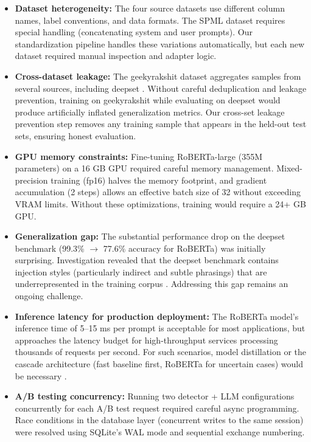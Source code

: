\documentclass[12pt, letterpaper]{article}   %
\begin{document}
\begin{itemize}
    \item \textbf{Dataset heterogeneity:} The four source datasets use different column names, label conventions, and data formats. The SPML dataset requires special handling (concatenating system and user prompts). Our standardization pipeline handles these variations automatically, but each new dataset required manual inspection and adapter logic.

    \item \textbf{Cross-dataset leakage:} The geekyrakshit dataset aggregates samples from several sources, including deepset \cite{ref33}\cite{ref1}. Without careful deduplication and leakage prevention, training on geekyrakshit while evaluating on deepset would produce artificially inflated generalization metrics. Our cross-set leakage prevention step removes any training sample that appears in the held-out test sets, ensuring honest evaluation.

    \item \textbf{GPU memory constraints:} Fine-tuning RoBERTa-large (355M parameters) on a 16 GB GPU required careful memory management. Mixed-precision training (fp16) halves the memory footprint, and gradient accumulation (2 steps) allows an effective batch size of 32 without exceeding VRAM limits. Without these optimizations, training would require a 24+ GB GPU.

    \item \textbf{Generalization gap:} The substantial performance drop on the deepset benchmark (99.3\% $\rightarrow$ 77.6\% accuracy for RoBERTa) was initially surprising. Investigation revealed that the deepset benchmark contains injection styles (particularly indirect and subtle phrasings) that are underrepresented in the training corpus \cite{ref10}. Addressing this gap remains an ongoing challenge.

    \item \textbf{Inference latency for production deployment:} The RoBERTa model's inference time of 5--15 ms per prompt is acceptable for most applications, but approaches the latency budget for high-throughput services processing thousands of requests per second. For such scenarios, model distillation or the cascade architecture (fast baseline first, RoBERTa for uncertain cases) would be necessary \cite{ref13}\cite{ref38}.

    \item \textbf{A/B testing concurrency:} Running two detector + LLM configurations concurrently for each A/B test request required careful async programming. Race conditions in the database layer (concurrent writes to the same session) were resolved using SQLite's WAL mode and sequential exchange numbering.


\end{itemize}
\end{document}

